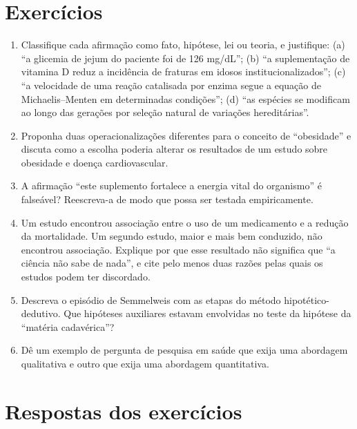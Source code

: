 \documentclass[
]{book}
\begin{document}
\section{Exercícios}\label{exercuxedcios}

\begin{enumerate}
\def\labelenumi{\arabic{enumi}.}
\item
  Classifique cada afirmação como fato, hipótese, lei ou teoria, e justifique: (a) ``a glicemia de jejum do paciente foi de 126 mg/dL''; (b) ``a suplementação de vitamina D reduz a incidência de fraturas em idosos institucionalizados''; (c) ``a velocidade de uma reação catalisada por enzima segue a equação de Michaelis--Menten em determinadas condições''; (d) ``as espécies se modificam ao longo das gerações por seleção natural de variações hereditárias''.
\item
  Proponha duas operacionalizações diferentes para o conceito de ``obesidade'' e discuta como a escolha poderia alterar os resultados de um estudo sobre obesidade e doença cardiovascular.
\item
  A afirmação ``este suplemento fortalece a energia vital do organismo'' é falseável? Reescreva-a de modo que possa ser testada empiricamente.
\item
  Um estudo encontrou associação entre o uso de um medicamento e a redução da mortalidade. Um segundo estudo, maior e mais bem conduzido, não encontrou associação. Explique por que esse resultado não significa que ``a ciência não sabe de nada'', e cite pelo menos duas razões pelas quais os estudos podem ter discordado.
\item
  Descreva o episódio de Semmelweis com as etapas do método hipotético-dedutivo. Que hipóteses auxiliares estavam envolvidas no teste da hipótese da ``matéria cadavérica''?
\item
  Dê um exemplo de pergunta de pesquisa em saúde que exija uma abordagem qualitativa e outro que exija uma abordagem quantitativa.
\end{enumerate}

\section{Respostas dos exercícios}\label{respostas-dos-exercuxedcios}
\end{document}
